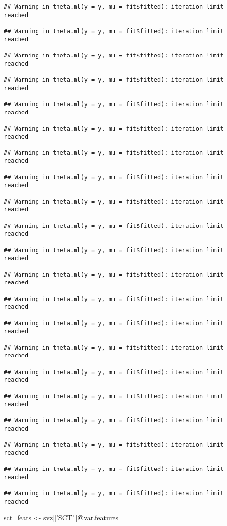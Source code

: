 \documentclass[
]{article}
\newenvironment{Shaded}{\begin{snugshade}}{\end{snugshade}}
\newcommand{\NormalTok}[1]{#1}
\newcommand{\OperatorTok}[1]{\textcolor[rgb]{0.81,0.36,0.00}{\textbf{#1}}}
\newcommand{\StringTok}[1]{\textcolor[rgb]{0.31,0.60,0.02}{#1}}
\begin{document}
\begin{verbatim}
## Warning in theta.ml(y = y, mu = fit$fitted): iteration limit reached

## Warning in theta.ml(y = y, mu = fit$fitted): iteration limit reached

## Warning in theta.ml(y = y, mu = fit$fitted): iteration limit reached

## Warning in theta.ml(y = y, mu = fit$fitted): iteration limit reached

## Warning in theta.ml(y = y, mu = fit$fitted): iteration limit reached

## Warning in theta.ml(y = y, mu = fit$fitted): iteration limit reached

## Warning in theta.ml(y = y, mu = fit$fitted): iteration limit reached

## Warning in theta.ml(y = y, mu = fit$fitted): iteration limit reached

## Warning in theta.ml(y = y, mu = fit$fitted): iteration limit reached

## Warning in theta.ml(y = y, mu = fit$fitted): iteration limit reached

## Warning in theta.ml(y = y, mu = fit$fitted): iteration limit reached

## Warning in theta.ml(y = y, mu = fit$fitted): iteration limit reached

## Warning in theta.ml(y = y, mu = fit$fitted): iteration limit reached

## Warning in theta.ml(y = y, mu = fit$fitted): iteration limit reached

## Warning in theta.ml(y = y, mu = fit$fitted): iteration limit reached

## Warning in theta.ml(y = y, mu = fit$fitted): iteration limit reached

## Warning in theta.ml(y = y, mu = fit$fitted): iteration limit reached

## Warning in theta.ml(y = y, mu = fit$fitted): iteration limit reached

## Warning in theta.ml(y = y, mu = fit$fitted): iteration limit reached

## Warning in theta.ml(y = y, mu = fit$fitted): iteration limit reached

## Warning in theta.ml(y = y, mu = fit$fitted): iteration limit reached
\end{verbatim}

\begin{Shaded}
\begin{Highlighting}[]
\NormalTok{sct_feats <-}\StringTok{ }\NormalTok{svz[[}\StringTok{'SCT'}\NormalTok{]]}\OperatorTok{@}\NormalTok{var.features}
\end{Highlighting}
\end{Shaded}
\end{document}
